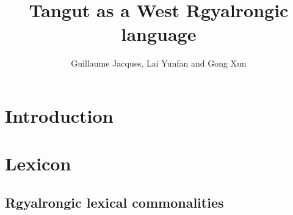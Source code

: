 \documentclass[oneside,a4paper,11pt]{article}
\begin{document}
 
 
 \title{Tangut as a West Rgyalrongic language}
  \author{Guillaume Jacques, Lai Yunfan and Gong Xun}
 \maketitle 
 
\section*{Introduction}

\citet{jackson00sidaba, jackson00puxi}

\section{Lexicon} 
\citet{jacques14esquisse}
\subsection{Rgyalrongic lexical commonalities}
\end{document}
